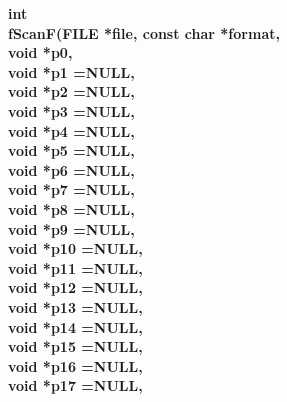 \begin{flushleft} \textbf{%
int  \\ 
\settowidth{\otherStuffIncludeArgIndent}{fScanF(}%
fScanF(FILE *file, const char *format, \\ 
\hspace{\otherStuffIncludeArgIndent}void *p0,\\ 
\hspace{\otherStuffIncludeArgIndent}void *p1  =NULL, \\ 
\hspace{\otherStuffIncludeArgIndent}void *p2  =NULL, \\ 
\hspace{\otherStuffIncludeArgIndent}void *p3  =NULL,\\ 
\hspace{\otherStuffIncludeArgIndent}void *p4  =NULL,\\ 
\hspace{\otherStuffIncludeArgIndent}void *p5  =NULL,\\ 
\hspace{\otherStuffIncludeArgIndent}void *p6  =NULL,\\ 
\hspace{\otherStuffIncludeArgIndent}void *p7  =NULL,\\ 
\hspace{\otherStuffIncludeArgIndent}void *p8  =NULL,\\ 
\hspace{\otherStuffIncludeArgIndent}void *p9  =NULL,\\ 
\hspace{\otherStuffIncludeArgIndent}void *p10  =NULL,\\ 
\hspace{\otherStuffIncludeArgIndent}void *p11  =NULL,\\ 
\hspace{\otherStuffIncludeArgIndent}void *p12  =NULL,\\ 
\hspace{\otherStuffIncludeArgIndent}void *p13  =NULL,\\ 
\hspace{\otherStuffIncludeArgIndent}void *p14  =NULL,\\ 
\hspace{\otherStuffIncludeArgIndent}void *p15  =NULL,\\ 
\hspace{\otherStuffIncludeArgIndent}void *p16  =NULL,\\ 
\hspace{\otherStuffIncludeArgIndent}void *p17  =NULL,\\ 
}
\end{flushleft}
